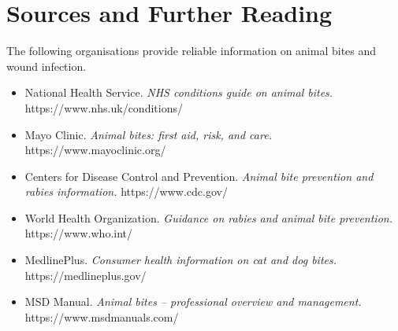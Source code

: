 \section*{Sources and Further Reading}
The following organisations provide reliable information on animal bites and wound infection.

\begin{itemize}
    \item National Health Service. \textit{NHS conditions guide on animal bites.} https://www.nhs.uk/conditions/
    \item Mayo Clinic. \textit{Animal bites: first aid, risk, and care.} https://www.mayoclinic.org/
    \item Centers for Disease Control and Prevention. \textit{Animal bite prevention and rabies information.} https://www.cdc.gov/
    \item World Health Organization. \textit{Guidance on rabies and animal bite prevention.} https://www.who.int/
    \item MedlinePlus. \textit{Consumer health information on cat and dog bites.} https://medlineplus.gov/
    \item MSD Manual. \textit{Animal bites -- professional overview and management.} https://www.msdmanuals.com/
\end{itemize}
